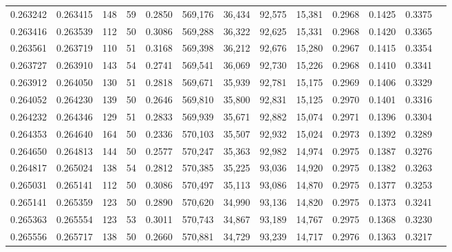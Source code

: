 \begin{tabular}{rrrrrrrrrrrrr}
0.263242 & 0.263415 &   148 &  59 &                                     0.2850 & 569,176 &  36,434 &  92,575 &  15,381 & 0.2968 & 0.1425 & 0.3375 \\
0.263416 & 0.263539 &   112 &  50 &                                     0.3086 & 569,288 &  36,322 &  92,625 &  15,331 & 0.2968 & 0.1420 & 0.3365 \\
0.263561 & 0.263719 &   110 &  51 &                                     0.3168 & 569,398 &  36,212 &  92,676 &  15,280 & 0.2967 & 0.1415 & 0.3354 \\
0.263727 & 0.263910 &   143 &  54 &                                     0.2741 & 569,541 &  36,069 &  92,730 &  15,226 & 0.2968 & 0.1410 & 0.3341 \\
0.263912 & 0.264050 &   130 &  51 &                                     0.2818 & 569,671 &  35,939 &  92,781 &  15,175 & 0.2969 & 0.1406 & 0.3329 \\
0.264052 & 0.264230 &   139 &  50 &                                     0.2646 & 569,810 &  35,800 &  92,831 &  15,125 & 0.2970 & 0.1401 & 0.3316 \\
0.264232 & 0.264346 &   129 &  51 &                                     0.2833 & 569,939 &  35,671 &  92,882 &  15,074 & 0.2971 & 0.1396 & 0.3304 \\
0.264353 & 0.264640 &   164 &  50 &                                     0.2336 & 570,103 &  35,507 &  92,932 &  15,024 & 0.2973 & 0.1392 & 0.3289 \\
0.264650 & 0.264813 &   144 &  50 &                                     0.2577 & 570,247 &  35,363 &  92,982 &  14,974 & 0.2975 & 0.1387 & 0.3276 \\
0.264817 & 0.265024 &   138 &  54 &                                     0.2812 & 570,385 &  35,225 &  93,036 &  14,920 & 0.2975 & 0.1382 & 0.3263 \\
0.265031 & 0.265141 &   112 &  50 &                                     0.3086 & 570,497 &  35,113 &  93,086 &  14,870 & 0.2975 & 0.1377 & 0.3253 \\
0.265141 & 0.265359 &   123 &  50 &                                     0.2890 & 570,620 &  34,990 &  93,136 &  14,820 & 0.2975 & 0.1373 & 0.3241 \\
0.265363 & 0.265554 &   123 &  53 &                                     0.3011 & 570,743 &  34,867 &  93,189 &  14,767 & 0.2975 & 0.1368 & 0.3230 \\
0.265556 & 0.265717 &   138 &  50 &                                     0.2660 & 570,881 &  34,729 &  93,239 &  14,717 & 0.2976 & 0.1363 & 0.3217 \\

\end{tabular}
